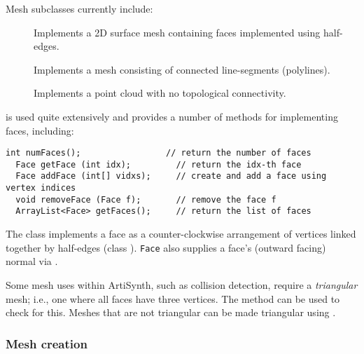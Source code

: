 Mesh subclasses currently include:

\begin{description}

\item[]\mbox{}

Implements a 2D surface
mesh containing faces implemented using half-edges.

\item[]\mbox{}

Implements a mesh
consisting of connected line-segments (polylines).

\item[]\mbox{}

Implements a point cloud with
no topological connectivity.

\end{description}

 is used quite extensively
and provides a number of methods for implementing faces, including:
%
\begin{lstlisting}[]
  int numFaces();                 // return the number of faces
  Face getFace (int idx);         // return the idx-th face
  Face addFace (int[] vidxs);     // create and add a face using vertex indices
  void removeFace (Face f);       // remove the face f
  ArrayList<Face> getFaces();     // return the list of faces
\end{lstlisting}
%
The class  implements a face as a
counter-clockwise arrangement of vertices linked together by
half-edges (class ).
{\tt Face} also supplies a face's (outward facing) normal
via 
.

Some mesh uses within ArtiSynth, such as collision detection, require a
{\it triangular} mesh; i.e., one where all faces have three vertices.
The method 
can be used to check for this. Meshes that are not triangular can be
made triangular using 
.

\subsubsection{Mesh creation}

